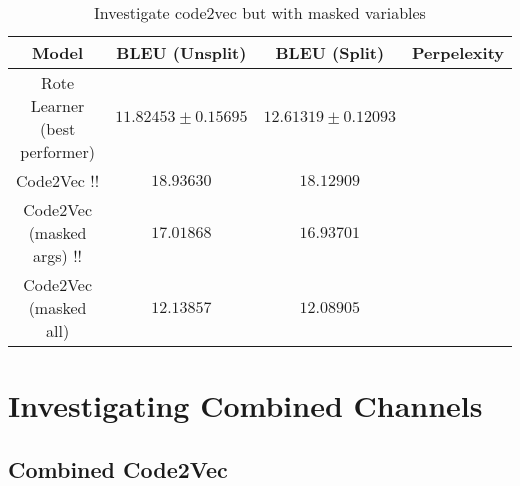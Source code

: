 \begin{table}[ht!]
\begin{center}
\begin{tabular}{ c | c | c | c }
    Model                             & BLEU (Unsplit)  & BLEU (Split)    & Perpelexity \\
    \hline
    Rote Learner (best performer)          & $ 11.82453 \pm  0.15695 $ & $ 12.61319 \pm 0.12093 $ & \\
    \hline
    Code2Vec                !!              & $ 18.93630 $ & $ 18.12909 $ & \\
    Code2Vec (masked args)  !!              & $ 17.01868 $ & $ 16.93701 $ & \\
    Code2Vec (masked all)                 & $ 12.13857 $ & $ 12.08905 $ & \\

    \hline
\end{tabular}
\caption {Investigate code2vec but with masked variables}
\label{table:code_2_vec_masked}
\end{center}
\end{table}


\section{Investigating Combined Channels} %
\label{sec:investigating_combined_channels}


\subsection{Combined Code2Vec } %
\label{sub:combined_code2vec}


